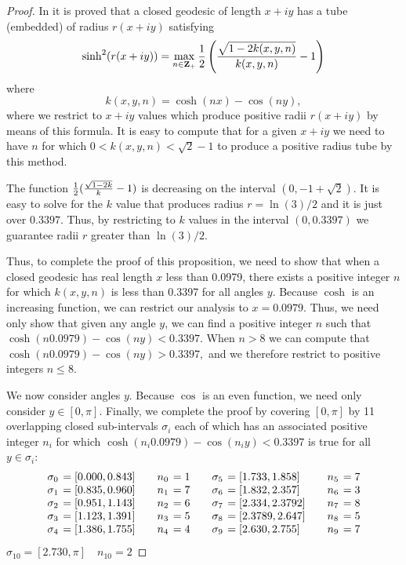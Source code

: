 \begin{proof}   In  \cite{M1} it is proved that a closed geodesic of length $x + iy$ has a tube (embedded) of radius $r(x + iy)$ satisfying 
$$
\sinh^2(r(x + iy))  =  \max_{n \in {\mathbf Z_+}} {1 \over 2} \left({\sqrt{1 - 2k(x,y,n)} \over k(x,y,n)} - 1\right) 
$$
where
$$k(x,y,n)  =  \cosh(nx) -
\cos(ny),
$$
 where we restrict to $x+iy$ values which produce positive radii $r(x + iy)$ by means of this formula. It is easy to compute that for a
given $x+iy$ we need to have $n$ for which $0 < k(x,y,n) < \sqrt 2 - 1$ to produce a positive radius tube by this method.

The function ${1 \over 2} ({\sqrt{1 - 2k} \over k} - 1)$ is decreasing on the interval $(0, -1 + \sqrt 2).$  It is easy to solve for the $k$ value that produces radius $r = \ln(3)/2$ and it is just over $0.3397.$ Thus, by restricting to $k$ values in the interval $(0,0.3397)$ we guarantee radii $r$ greater than $\ln(3)/2.$

Thus, to complete the proof of this proposition, we need to show that when a closed geodesic has real length $x$ less than 0.0979,  there exists a positive integer $n$ for which $k(x,y,n)$ is less than 0.3397
for all angles $y$.
Because $\cosh$ is an increasing function, we can restrict our analysis to $x = 0.0979.$  Thus,  we need only show that given
\pagebreak any angle $y$, we can find a positive integer $n$ such that 
$\cosh(n 0.0979) - \cos(ny) < 0.3397.$  When $n > 8$ we can compute that $\cosh(n 0.0979) - \cos(ny) > 0.3397,$ and we therefore restrict to positive integers $n \leq 8.$  

We now consider angles $y$.  Because $\cos$ is an even function, we need only consider $y \in [0, \pi].$  
Finally, we complete the proof by covering $[0,\pi]$ by 11 overlapping closed sub-intervals $\sigma_i$ each of which has an associated positive integer $n_i$ for which $\cosh(n_i 0.0979) - \cos(n_i y) < 0.3397$ is
 true for all $y \in \sigma_i$:
$$
\begin{array}{rlrlrlrl}
\sigma_0&\hskip-6pt= [0.000, 0.843] &\quad n_0 &\hskip-6pt= 1&\quad
   \sigma_5&\hskip-6pt= [1.733, 1.858] &\quad n_5 &\hskip-6pt= 7\\
 \sigma_1 &\hskip-6pt= [0.835, 0.960] & n_1&\hskip-6pt= 7&
   \sigma_6&\hskip-6pt= [1.832, 2.357] & n_6&\hskip-6pt= 3\\
 \sigma_2&\hskip-6pt= [0.951, 1.143]& n_2&\hskip-6pt= 6&
   \sigma_7&\hskip-6pt= [2.334, 2.3792]& n_7&\hskip-6pt= 8\\
 \sigma_3 &\hskip-6pt= [1.123, 1.391] & n_3&\hskip-6pt= 5&
   \sigma_8&\hskip-6pt= [2.3789, 2.647] & n_8 &\hskip-6pt= 5\\
 \sigma_4&\hskip-6pt= [1.386, 1.755] & n_4 &\hskip-6pt= 4&
   \sigma_9 &\hskip-6pt= [2.630, 2.755]&n_9&\hskip-6pt= 7\\
\end{array}
$$
\hfill $ \sigma_{10}  = [2.730, \pi] \quad  n_{10}  = 2$ 
\end{proof}

